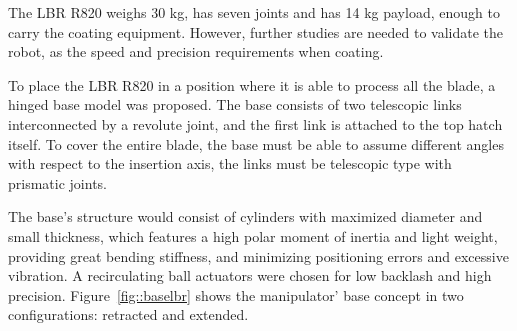 

The LBR R820 weighs 30 kg, has seven joints and has 14 kg payload, enough to
carry the coating equipment. However, further studies are needed to validate
the robot, as the speed and precision requirements when coating.


To place the LBR R820 in a position where it is able to process all the
blade, a hinged base model was proposed. The base consists of two telescopic
links interconnected by a revolute joint, and the first link is attached to the
top hatch itself. To cover the entire blade, the base must be able to assume different angles with
respect to the insertion axis, the links must be telescopic type with
prismatic joints.  

The base's structure would consist of cylinders with maximized diameter and
small thickness, which features a high polar moment of inertia and light weight,
providing great bending stiffness, and minimizing positioning errors and
excessive vibration. A recirculating ball actuators were chosen for low
backlash and high precision. Figure~\ref{fig::baselbr} shows the manipulator'
base concept in two configurations: retracted and extended.



